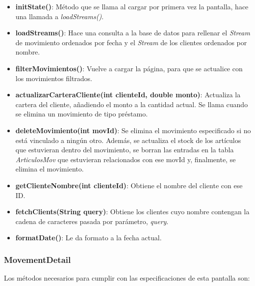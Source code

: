 \begin{itemize}
	\item \textbf{initState()}: Método que se llama al cargar por primera vez la pantalla, hace una llamada a \textit{loadStreams()}.
	\item \textbf{loadStreams()}: Hace una consulta a la base de datos para rellenar el \textit{Stream} de movimiento ordenados por fecha y el \textit{Stream} de los clientes ordenados por nombre.  
	\item \textbf{filterMovimientos()}: Vuelve a cargar la página, para que se actualice con los movimientos filtrados. 
	\item \textbf{actualizarCarteraCliente(int clienteId, double monto)}: Actualiza la cartera del cliente, añadiendo el monto a la cantidad actual. Se llama cuando se elimina un movimiento de tipo préstamo.  
	\item \textbf{deleteMovimiento(int movId)}: Se elimina el movimiento especificado si no está vinculado a ningún otro. Además, se actualiza el stock de los artículos que estuvieran dentro del movimiento, se borran las entradas en la tabla \textit{ArticulosMov} que estuvieran relacionados con ese movId y, finalmente, se elimina el movimiento. 
	\item \textbf{getClienteNombre(int clienteId)}: Obtiene el nombre del cliente con ese ID. 
	\item \textbf{fetchClients(String query)}: Obtiene los clientes cuyo nombre contengan la cadena de caracteres pasada por parámetro, \textit{query}. 
	\item \textbf{formatDate()}: Le da formato a la fecha actual. 	
\end{itemize}

\subsubsection{MovementDetail}

Los métodos necesarios para cumplir con las especificaciones de esta pantalla son:
 
